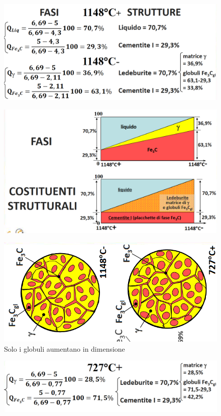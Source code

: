 \documentclass{article}
\begin{document}
{\begin{figure}[h!]
            \end{figure}
            \begin{figure}[h!]
                \centering
                \includegraphics[width=.8\linewidth]{L14 - C = 5 Calcolo da 1148+ a 1148-.png}
            \end{figure}
            \begin{figure}[h!]
                \centering
                \includegraphics[width=.8\linewidth]{L14 - C = 5 Diagrammi di Fasi e Costituenti da 1148+ a 1148-.png}
            \end{figure}
            \begin{figure}[h!]
                \centering
                \includegraphics[width=.7\linewidth]{L14 - C = 5 Strutture da 1148- a 727+.png}
                \caption{Solo i globuli aumentano in dimensione}
            \end{figure}
            \begin{figure}[h!]
                \centering
                \includegraphics[width=.8\linewidth]{L14 - C = 5 Calcolo da 1148- a 727+.png}

\end{figure}}
\end{document}
